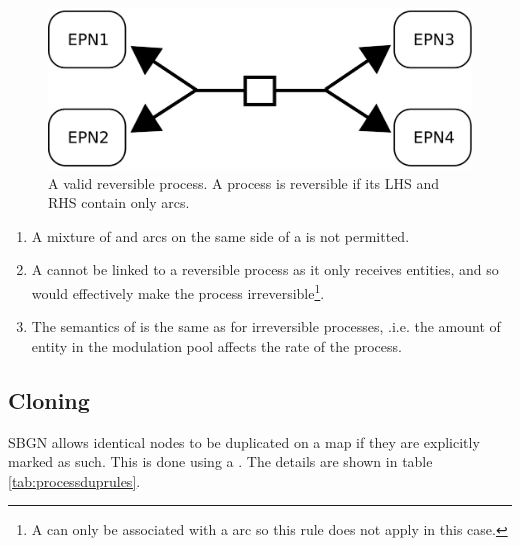\begin{figure}[H]
  \centering
  \includegraphics[scale = 0.4]{images/reversible_process}
  \caption{A valid reversible process. A process is reversible if its LHS and RHS contain only  arcs.}
  \label{fig:process-reversibility}
\end{figure}
 
\begin{enumerate}
\item  A mixture of  and  arcs on the same side of a  is not permitted.
\item A  cannot be linked to a reversible process as it only receives entities, and so would effectively make the process irreversible\footnote{A  can only be associated with a  arc so this rule does not apply in this case.}.
\item The semantics of  is the same as for irreversible processes, .i.e. the amount of entity in the modulation pool affects the rate of the process.
\end{enumerate}

 
\subsection{Cloning}

SBGN allows identical nodes to be duplicated on a map if they are
explicitly marked as such. This is done using a . The details are shown in table \ref{tab:processduprules}.


